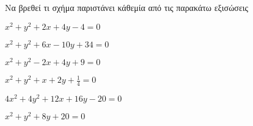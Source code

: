 Να βρεθεί τι σχήμα παριστάνει κάθεμία από τις παρακάτω εξισώσεις
\begin{alist}
\item $ x^2+y^2+2x+4y-4=0 $
\item $ x^2+y^2+6x-10y+34=0 $
\item $ x^2+y^2-2x+4y+9=0 $
\item $ x^2+y^2+x+2y+\frac{1}{4}=0 $
\item $ 4x^2+4y^2+12x+16y-20=0 $
\item $ x^2+y^2+8y+20=0 $
\end{alist}
